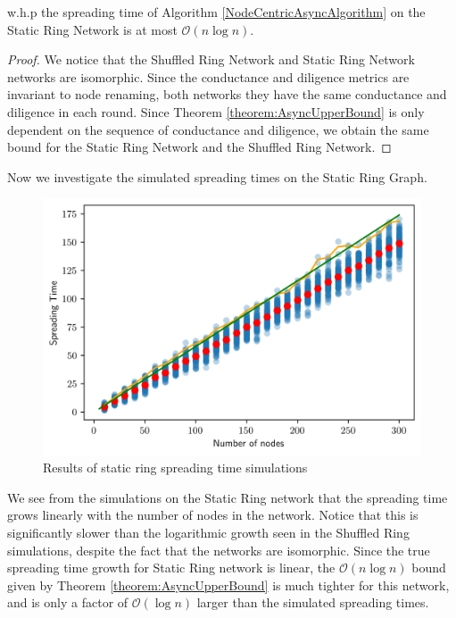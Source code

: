 \begin{theorem}\label{theorem:staticRingAsyncBound}
	w.h.p the spreading time of Algorithm \ref{NodeCentricAsyncAlgorithm} on the Static Ring Network is at most $\mathcal{O}(n \log n)$.
\end{theorem}

\begin{proof}
	We notice that the Shuffled Ring Network and Static Ring Network networks are isomorphic. Since the conductance and diligence metrics are invariant to node renaming, both networks they have the same conductance and diligence in each round. Since Theorem \ref{theorem:AsyncUpperBound} is only dependent on the sequence of conductance and diligence, we obtain the same bound for the Static Ring Network and the Shuffled Ring Network.
\end{proof} 

Now we investigate the simulated spreading times on the Static Ring Graph.

\begin{figure}[h]
	\centering
	\includegraphics[width=1\textwidth]{./figures/static_ring_simulation_results.png}
	\caption{Results of static ring spreading time simulations}
	\label{fig:staticRingSimResults}
\end{figure}

We see from the simulations on the Static Ring network that the spreading time grows linearly with the number of nodes in the network. Notice that this is significantly slower than the logarithmic growth seen in the Shuffled Ring simulations, despite the fact that the networks are isomorphic.
Since the true spreading time growth for Static Ring network is linear, the $\mathcal{O}(n \log n)$ bound given by Theorem \ref{theorem:AsyncUpperBound} is much tighter for this network, and is only a factor of $\mathcal{O}(\log n)$ larger than the simulated spreading times.

